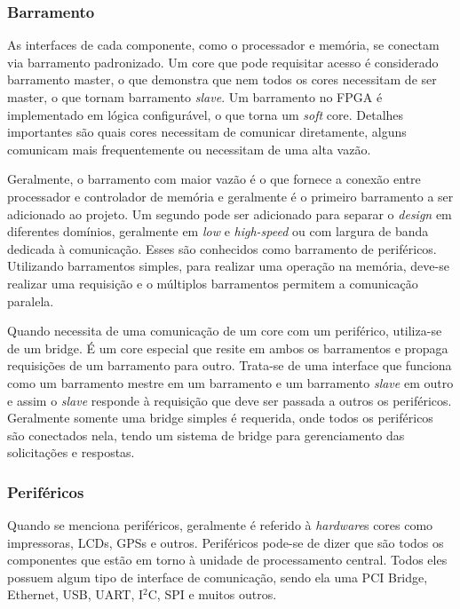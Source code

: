 \subsubsection{Barramento}

As interfaces de cada componente, como o processador e memória, se conectam via barramento padronizado. Um core que pode requisitar acesso é considerado barramento master, o que demonstra que nem todos os cores necessitam de ser master, o que tornam barramento \textit{slave}. Um barramento no FPGA é implementado em lógica configurável, o que torna um \textit{soft} core. Detalhes importantes são quais cores necessitam de comunicar diretamente, alguns comunicam mais frequentemente ou necessitam de uma alta vazão.

Geralmente, o barramento com maior vazão é o que fornece a conexão entre processador e controlador de memória e geralmente é o primeiro barramento a ser adicionado ao projeto. Um segundo pode ser adicionado para separar o \textit{design} em diferentes domínios, geralmente em \textit{low} e \textit{high-speed} ou com largura de banda dedicada à comunicação. Esses são conhecidos como barramento de periféricos. Utilizando barramentos simples, para realizar uma operação na memória, deve-se realizar uma requisição e o múltiplos barramentos permitem a comunicação paralela.

Quando necessita de uma comunicação de um core com um periférico, utiliza-se de um bridge. É um core especial que resite em ambos os barramentos e propaga requisições de um barramento para outro. Trata-se de uma interface que funciona como um barramento mestre em um barramento e um barramento \textit{\textit{slave}} em outro e assim o \textit{\textit{slave}} responde à requisição que deve ser passada a outros os periféricos. Geralmente somente uma bridge simples é requerida, onde todos os periféricos são conectados nela, tendo um sistema de bridge para gerenciamento das solicitações e respostas.


\subsubsection{Periféricos}

Quando se menciona periféricos, geralmente é referido à \textit{hardware}s cores como impressoras, LCDs, GPSs e outros. Periféricos pode-se de dizer que são todos os componentes que estão em torno à unidade de processamento central. Todos eles possuem algum tipo de interface de comunicação, sendo ela uma PCI Bridge, Ethernet, USB, UART, I$^2$C, SPI e muitos outros.


